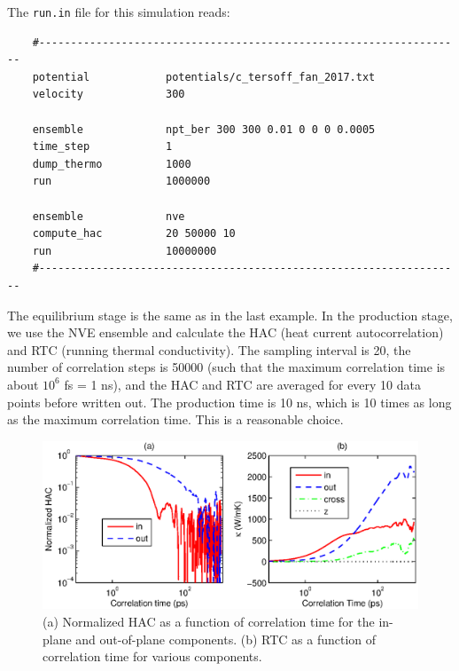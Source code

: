 \documentclass[12pt,a4paper]{report}
\begin{document}
The \verb"run.in" file for this simulation reads:
\begin{verbatim}
    #-------------------------------------------------------------------
    potential            potentials/c_tersoff_fan_2017.txt
    velocity             300

    ensemble             npt_ber 300 300 0.01 0 0 0 0.0005
    time_step            1
    dump_thermo          1000
    run                  1000000

    ensemble             nve
    compute_hac          20 50000 10
    run                  10000000
    #-------------------------------------------------------------------
\end{verbatim}

The equilibrium stage is the same as in the last example. In the production stage, we use the NVE ensemble and calculate the HAC (heat current autocorrelation) and RTC (running thermal conductivity). The sampling interval is 20, the number of correlation steps is 50000 (such that the maximum correlation time is about $10^6$ fs = 1 ns), and the HAC and RTC are averaged for every 10 data points before written out. The production time is 10 ns, which is 10 times as long as the maximum correlation time. This is a reasonable choice.


\begin{figure}[ht]
\begin{center}
\includegraphics[width=\columnwidth]{ex3.eps}
\caption{(a) Normalized HAC as a function of correlation time for the in-plane and out-of-plane components. (b) RTC as a function of correlation time for various components. }
\label{figure:ex3}
\end{center}
\end{figure}
\end{document}
